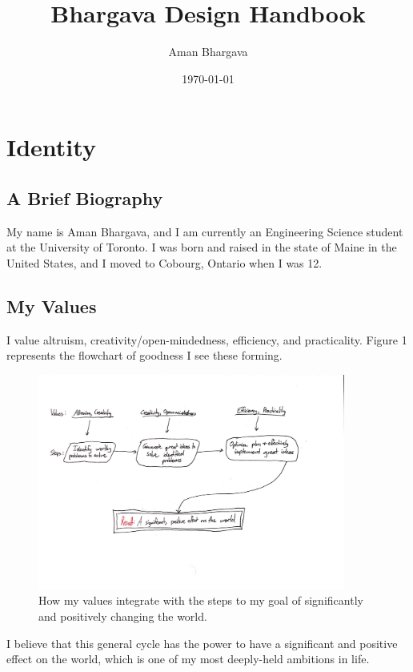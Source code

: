 \documentclass[a4paper,12pt]{article}
\begin{document}
\title{Bhargava Design Handbook}
\author{Aman Bhargava}
\date{\today}
\maketitle

\tableofcontents

\section{Identity}
\subsection{A Brief Biography}
My name is Aman Bhargava, and I am currently an Engineering Science student at the University of Toronto. I was born and raised in the state of Maine in the United States, and I moved to Cobourg, Ontario when I was 12.

\subsection{My Values}
I value altruism, creativity/open-mindedness, efficiency, and practicality. Figure 1 represents the flowchart of goodness I see these forming.

\begin{figure}[H]
\centering
\includegraphics[width=0.9\textwidth]{img/image001.png}
\caption{How my values integrate with the steps to my goal of significantly and positively changing the world.}
\label{}
\end{figure}

I believe that this general cycle has the power to have a significant and positive effect on the world, which is one of my most deeply-held ambitions in life.
\end{document}

